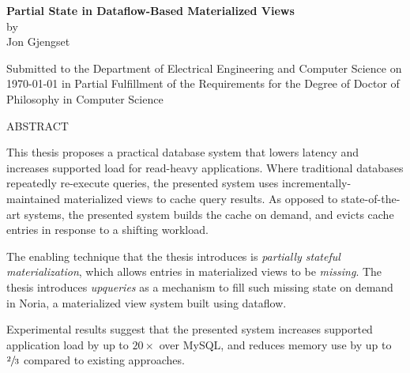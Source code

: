 \documentclass[fontsize=12pt,paper=letter]{scrartcl}
\begin{document}
\begin{titlepage}
  \begin{center}
    \textbf{\large Partial State in Dataflow-Based Materialized Views}\\
    \vspace{0.5\baselineskip}
    by\\
    \vspace{0.5\baselineskip}
    {\large Jon Gjengset}\\
    \vspace{0.5\baselineskip}
    \begin{addmargin}[0.15in]{0.15in}
      \centering
    Submitted to the Department of
    Electrical Engineering and Computer Science
    on \today{}
    in Partial Fulfillment of the Requirements for the Degree of
    Doctor of Philosophy in Computer Science
    \end{addmargin}
  \end{center}

  \vspace{0.5\baselineskip}
  \begin{flushleft}
  ABSTRACT
  \vspace{0.5\baselineskip}

  This thesis proposes a practical database system that lowers latency and
    increases supported load for read-heavy applications. Where traditional
    databases repeatedly re-execute queries, the presented system uses
    incrementally-maintained materialized views to cache query results. As
    opposed to state-of-the-art systems, the presented system builds the cache
    on demand, and evicts cache entries in response to a shifting workload.

  \vspace{0.5\baselineskip}

  The enabling technique that the thesis introduces is \textit{partially
    stateful materialization}, which allows entries in materialized views to be
    \textit{missing}. The thesis introduces \textit{upqueries} as a mechanism to
    fill such missing state on demand in Noria, a materialized view system built
    using dataflow.

  \vspace{0.5\baselineskip}

  Experimental results suggest that the presented system increases supported
    application load by up to $20\times$ over MySQL, and reduces memory use by
    up to $\sfrac{2}{3}$ compared to existing approaches.


\end{flushleft}
\end{titlepage}
\end{document}

